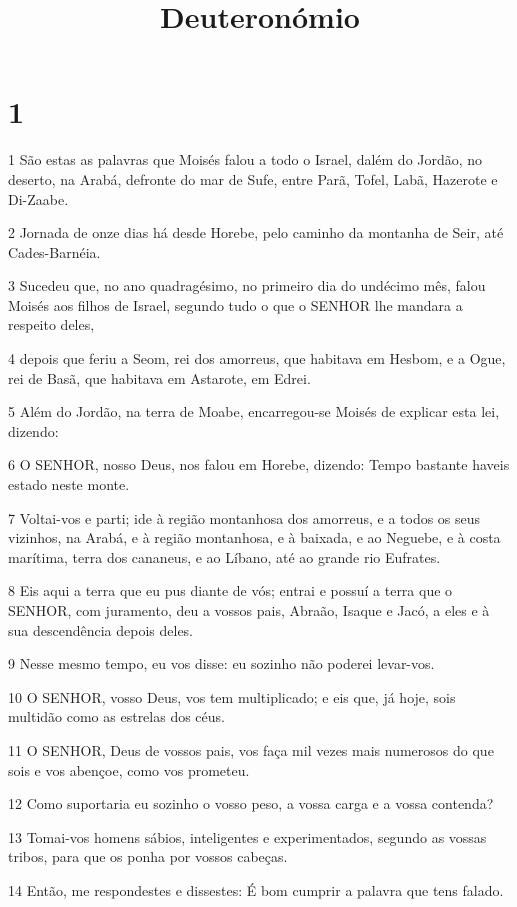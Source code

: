 

\title{Deuteronómio}


\chapter{1}

\par 1 São estas as palavras que Moisés falou a todo o Israel, dalém do Jordão, no deserto, na Arabá, defronte do mar de Sufe, entre Parã, Tofel, Labã, Hazerote e Di-Zaabe.
\par 2 Jornada de onze dias há desde Horebe, pelo caminho da montanha de Seir, até Cades-Barnéia.
\par 3 Sucedeu que, no ano quadragésimo, no primeiro dia do undécimo mês, falou Moisés aos filhos de Israel, segundo tudo o que o SENHOR lhe mandara a respeito deles,
\par 4 depois que feriu a Seom, rei dos amorreus, que habitava em Hesbom, e a Ogue, rei de Basã, que habitava em Astarote, em Edrei.
\par 5 Além do Jordão, na terra de Moabe, encarregou-se Moisés de explicar esta lei, dizendo:
\par 6 O SENHOR, nosso Deus, nos falou em Horebe, dizendo: Tempo bastante haveis estado neste monte.
\par 7 Voltai-vos e parti; ide à região montanhosa dos amorreus, e a todos os seus vizinhos, na Arabá, e à região montanhosa, e à baixada, e ao Neguebe, e à costa marítima, terra dos cananeus, e ao Líbano, até ao grande rio Eufrates.
\par 8 Eis aqui a terra que eu pus diante de vós; entrai e possuí a terra que o SENHOR, com juramento, deu a vossos pais, Abraão, Isaque e Jacó, a eles e à sua descendência depois deles.
\par 9 Nesse mesmo tempo, eu vos disse: eu sozinho não poderei levar-vos.
\par 10 O SENHOR, vosso Deus, vos tem multiplicado; e eis que, já hoje, sois multidão como as estrelas dos céus.
\par 11 O SENHOR, Deus de vossos pais, vos faça mil vezes mais numerosos do que sois e vos abençoe, como vos prometeu.
\par 12 Como suportaria eu sozinho o vosso peso, a vossa carga e a vossa contenda?
\par 13 Tomai-vos homens sábios, inteligentes e experimentados, segundo as vossas tribos, para que os ponha por vossos cabeças.
\par 14 Então, me respondestes e dissestes: É bom cumprir a palavra que tens falado.

